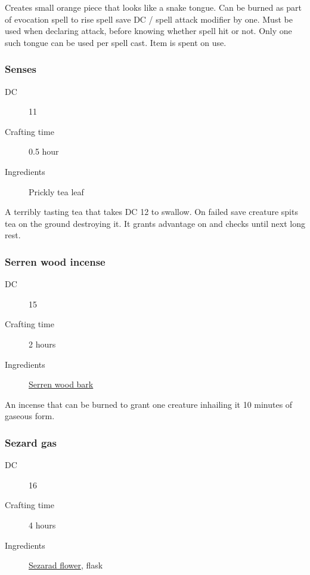 Creates small orange piece that looks like a snake tongue. 
Can be burned as part of evocation spell to rise  spell save DC / spell attack modifier by one. Must be used when declaring attack, before knowing whether spell hit or not. Only one such tongue can be used per spell cast. Item is spent on use.

\subsubsection{Senses}
\label{Senses}

\begin{description}
\item [DC] 11 \survival
\item [Crafting time] 0.5 hour
\item [Ingredients] Prickly tea leaf
\end{description}

A terribly tasting tea that takes DC 12 \constitutionsave to swallow. On failed save
creature spits tea on the ground destroying it.
It grants advantage on \perception and \investigation checks until next long rest.

\subsubsection{Serren wood incense}
\label{Serren wood incense}

\begin{description}
\item [DC] 15 \arcana
\item [Crafting time] 2 hours
\item [Ingredients] \hyperref[Serren Wood]{Serren wood bark}
\end{description}

An incense that can be burned to grant one creature inhailing it 10 minutes of gaseous form.

\subsubsection{Sezard gas}
\label{Sezard gas}

\begin{description}
\item [DC] 16 \survival
\item [Crafting time] 4 hours
\item [Ingredients] \hyperref[Sezarad]{Sezarad flower}, flask
\end{description}

